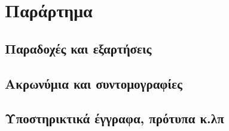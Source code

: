 \section{Παράρτημα}
\subsection{Παραδοχές και εξαρτήσεις}
\subsection{Ακρωνύμια και συντομογραφίες}
\subsection{Υποστηρικτικά έγγραφα, πρότυπα κ.λπ}